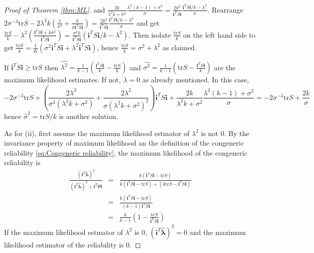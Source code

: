 \documentclass[twoside]{article}
\begin{document}
\begin{proof}[Proof of Theorem \ref{thm:ML}]
and $\frac{2k}{\lambda^{2}k+\sigma^{2}}\frac{\lambda^{2}(k-1)+\sigma^{2}}{\sigma}=\frac{2k^{2}}{\mathbf{i}^{T}S\mathbf{i}}\frac{\mathbf{i}^{T}S\mathbf{i}/k-\lambda^{2}}{\sigma}$.
Rearrange $2\sigma^{-3}\textrm{tr}S-2\lambda^{2}k(\frac{1}{\sigma^{3}}+\frac{k}{\sigma\mathbf{i}^{T}S\mathbf{i}})=\frac{2k^{2}}{\mathbf{i}^{T}S\mathbf{i}}\frac{\mathbf{i}^{T}S\mathbf{i}/k-\lambda^{2}}{\sigma}$
and get $\frac{\textrm{tr}S}{k}-\lambda^{2}(\frac{\mathbf{i}^{T}S\mathbf{i}+k\sigma^{2}}{\mathbf{i}^{T}S\mathbf{i}})=\frac{\sigma^{2}k}{\mathbf{i}^{T}S\mathbf{i}}(\mathbf{i}^{T}S\mathbf{i}/k-\lambda^{2})$.
Then isolate $\frac{\textrm{tr}S}{k}$ on the left hand side to get
$\frac{\textrm{tr}S}{k}=\frac{1}{K}(\sigma^{2}\mathbf{i}^{T}S\mathbf{i}+\lambda^{2}\mathbf{i}^{T}S\mathbf{i})$,
hence $\frac{\textrm{tr}S}{k}=\sigma^{2}+\lambda^{2}$ as claimed.

If $\mathbf{i}^{T}S\mathbf{i}\geq\textrm{tr}S$ then $\hat{\lambda^{2}}=\frac{1}{k-1}(\frac{\mathbf{i}^{T}S\mathbf{i}}{k}-\frac{\textrm{tr}S}{k})$
and $\hat{\sigma^{2}}=\frac{1}{k-1}(\textrm{tr}S-\frac{\mathbf{i}^{T}S\mathbf{i}}{k})$
are the maximum likelihood estimates. If not, $\lambda=0$ as already
mentioned. In this case,
\begin{equation*}
-2\sigma^{-3}\textrm{tr}S+\left(\frac{2\lambda^{2}}{\sigma^{3}(\lambda^{2}k+\sigma^{2})}+\frac{2\lambda^{2}}{\sigma(\lambda^{2}k+\sigma^{2})^{2}}\right)\mathbf{i}^{T}S\mathbf{i}+\frac{2k}{\lambda^{2}k+\sigma^{2}}\frac{\lambda^{2}(k-1)+\sigma^{2}}{\sigma} =
-2\sigma^{-3}\textrm{tr}S+\frac{2k}{\sigma}
\end{equation*}
hence $\hat{\sigma}^2=\textrm{tr}S/{k}$ is another solution.

As for (ii), first assume the maximum likelihood estmator of $\lambda^{2}$
is not $0$. By the invariance property of maximum likelihood an the definition of the congeneric reliability \eqref{eq:Congeneric reliability}, the maximum likelihood of the congeneric reliability is
\begin{eqnarray*}
\frac{(\mathbf{i}^{T}\mathbf{\hat{\lambda}})^{2}}{(\mathbf{i}^{T}\mathbf{\hat{\lambda}})^{2}+\mathbf{i}^{T}\Psi\mathbf{i}} & = & \frac{k(\mathbf{i}^{T}S\mathbf{i}-\textrm{tr}S)}{k(\mathbf{i}^{T}S\mathbf{i}-\textrm{tr}S)+(k\textrm{tr}S-\mathbf{i}^{T}S\mathbf{i})}\\
 & = & \frac{k(\mathbf{i}^{T}S\mathbf{i}-\textrm{tr}S)}{(k-1)\mathbf{i}^{T}S\mathbf{i}}\\
 & = & \frac{k}{k-1}\left(1-\frac{\textrm{tr}S}{\mathbf{i}^{T}S\mathbf{i}}\right)
\end{eqnarray*}
If the maximum likelihood estmator of $\lambda^{2}$ is $0$, $(\mathbf{i}^{T}\mathbf{\hat{\lambda}})^{2}=0$
and the maximum likelihood estimator of the reliability is $0.$
\end{proof}
\end{document}
